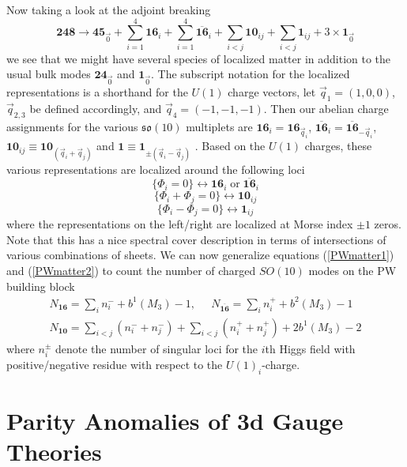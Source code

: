 \documentclass[12pt]{article}%
\numberwithin{equation}{section}
\renewcommand{\(}{\left(}
\renewcommand{\)}{\right)}
\renewcommand{\[}{\left[}
\renewcommand{\]}{\right]}
\begin{document}
Now taking a look at the adjoint breaking
\begin{equation}
\textbf{248}\rightarrow \textbf{45}_{\vec{0}}+\sum^4_{i=1} \textbf{16}_i+\sum^4_{i=1}\overline{\textbf{16}}_i+\sum_{i<j}\textbf{10}_{ij}+\sum_{i< j}\textbf{1}_{ij}+3\times \textbf{1}_{\vec{0}}
\end{equation}
we see that we might have several species of localized matter in addition to the usual bulk modes $\textbf{24}_{\vec{0}}$ and $\textbf{1}_{\vec{0}}$. The subscript notation for the localized representations is a shorthand for the $U(1)$ charge vectors, let $\vec{q}_1=(1,0,0)$, $\vec{q}_{2,3}$ be defined accordingly, and $\vec{q}_4=(-1,-1,-1)$. Then our abelian charge assignments for the various $\mathfrak{so}(10)$ multiplets are $\textbf{16}_i=\textbf{16}_{\vec{q}_i}$, $\overline{\textbf{16}}_i=\overline{\textbf{16}}_{-\vec{q}_i}$,$\textbf{10}_{ij} \equiv \textbf{10}_{(\vec{q}_i+\vec{q}_j)}$ and $\textbf{1} \equiv \textbf{1}_{\pm(\vec{q}_i-\vec{q}_j)}$ . Based on the $U(1)$ charges, these various representations are localized around the following loci
\begin{equation}
\{\Phi_i=0\}\leftrightarrow \textbf{16}_i \; \text{or} \; \overline{\textbf{16}}_i
\end{equation}
\begin{equation}
\{\Phi_i+\Phi_j=0\} \leftrightarrow \textbf{10}_{ij}
\end{equation}
\begin{equation}
\{\Phi_i-\Phi_j=0\} \leftrightarrow \textbf{1}_{ij}
\end{equation}
where the representations on the left/right are localized at Morse index $\pm1$ zeros. Note that this has a nice spectral cover description in terms of intersections of various combinations of sheets. We can now generalize equations (\ref{PWmatter1}) and (\ref{PWmatter2})
to count the number of charged $SO(10)$ modes on the PW building block
\begin{align}
N_{\textbf{16}}=\sum_i n_i^-+b^1(M_3)-1, \; \; \; \; \;  N_{\overline{\textbf{16}}}=\sum_i n_i^++b^2(M_3)-1 \\
N_{\textbf{10}}=\sum_{i<j} (n^-_i+n^-_j)+\sum_{i<j} (n^+_i+n^+_j)+2b^1(M_3)-2
\end{align}
where $n^{\pm}_i$ denote the number of singular loci for the $i$th Higgs field with positive/negative residue with respect to the $U(1)_i$-charge.



\section{Parity Anomalies of 3d Gauge Theories}\label{app:BORDISM}
\end{document}
